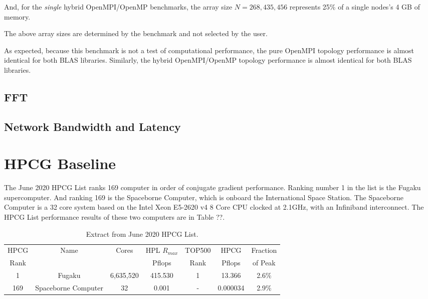 And, for the \emph{single} hybrid OpenMPI/OpenMP benchmarks, the array size $N = 268,435,456$ represents 25\% of a single nodes's 4 GB of memory.

The above array sizes are determined by the benchmark and not selected by the user.

As expected, because this benchmark is not a test of computational performance, the pure OpenMPI topology performance is almost identical for both BLAS libraries. Similarly, the hybrid OpenMPI/OpenMP topology performance is almost identical for both BLAS libraries.

 


%
%
\subsection{FFT}


%
%
\subsection{Network Bandwidth and Latency}



%
%
\section{HPCG Baseline}

The June 2020 HPCG List ranks 169 computer in order of conjugate gradient performance. Ranking number 1 in the list is the Fugaku supercomputer. And ranking 169 is the Spaceborne Computer, which is onboard the International Space Station. The Spaceborne Computer is a 32 core system based on the Intel Xeon E5-2620 v4 8 Core CPU clocked at 2.1GHz, with an Infiniband interconnect. The HPCG List performance results of these two computers are in Table ??.

\begin{table}[H]
\begin{center}
\begin{tabular}{ |c|c|c|c|c|c|c| } 
\hline
HPCG & Name & Cores & HPL $R_{max}$ & TOP500 & HPCG   & Fraction \\
Rank &      &       & Pflops        & Rank   & Pflops & of Peak  \\
\hline
1 & Fugaku & 6,635,520 & 415.530 & 1 & 13.366 & 2.6\% \\
\hline
169 & Spaceborne Computer & 32 & 0.001 & - & 0.000034 & 2.9\% \\
\hline
\end{tabular}
\end{center}
\caption{\label{tab:table-name}Extract from June 2020 HPCG List.}
\end{table}


